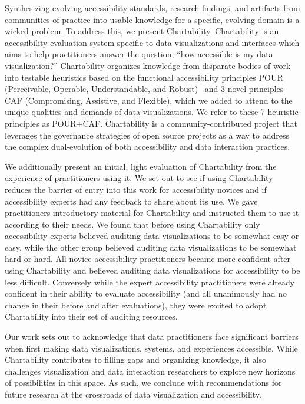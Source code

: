 \documentclass[12pt]{cmuthesis}
\begin{document}
Synthesizing evolving accessibility standards, research findings, and artifacts from communities of practice into usable knowledge for a specific, evolving domain is a wicked problem. To address this, we present Chartability. Chartability is an accessibility evaluation system specific to data visualizations and interfaces which aims to help practitioners answer the question, ``how accessible is my data visualization?'' Chartability organizes knowledge from disparate bodies of work into testable heuristics based on the functional accessibility principles POUR (Perceivable, Operable, Understandable, and Robust)~\cite{InitiativePrinciples} and 3 novel principles CAF (Compromising, Assistive, and Flexible), which we added to attend to the unique qualities and demands of data visualizations. We refer to these 7 heuristic principles as POUR+CAF. Chartability is a community-contributed project that leverages the governance strategies of open source projects as a way to address the complex dual-evolution of both accessibility and data interaction practices. 

We additionally present an initial, light evaluation of Chartability from the experience of practitioners using it. We set out to see if using Chartability reduces the barrier of entry into this work for accessibility novices and if accessibility experts had any feedback to share about its use. We gave practitioners introductory material for Chartability and instructed them to use it according to their needs. We found that before using Chartability only accessibility experts believed auditing data visualizations to be somewhat easy or easy, while the other group believed auditing data visualizations to be somewhat hard or hard. All novice accessibility practitioners became more confident after using Chartability and believed auditing data visualizations for accessibility to be less difficult. Conversely while the expert accessibility practitioners were already confident in their ability to evaluate accessibility (and all unanimously had no change in their before and after evaluations), they were excited to adopt Chartability into their set of auditing resources. 

Our work sets out to acknowledge that data practitioners face significant barriers when first making data visualizations, systems, and experiences accessible. While Chartability contributes to filling gaps and organizing knowledge, it also challenges visualization and data interaction researchers to explore new horizons of possibilities in this space. As such, we conclude with recommendations for future research at the crossroads of data visualization and accessibility. 
\end{document}
